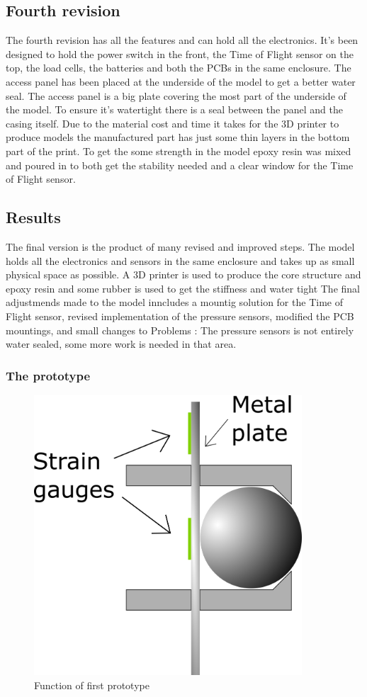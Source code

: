 \subsection{Fourth revision}

The fourth revision has all the features and can hold all the electronics. It's been designed to hold the power switch in the front, the Time of Flight sensor on the top, the load cells, the batteries and both the PCBs in the same enclosure. The access panel has been placed at the underside of the model to get a better water seal. The access panel is a big plate covering the most part of the underside of the model. To ensure it's watertight there is a seal between the panel and the casing itself.
Due to the material cost and time it takes for the 3D printer to produce models the manufactured part has just some thin layers in the bottom part of the print. To get the some strength in the model epoxy resin was mixed and poured in to both get the stability needed and a clear window for the Time of Flight sensor.

\subsection{Results}
The final version is the product of many revised and improved steps. The model holds all the electronics and sensors in the same enclosure and takes up as small physical space as possible. A 3D printer is used to produce the core structure and epoxy resin and some rubber is used to get the stiffness and water tight The final adjustmends made to the model inncludes a mountig solution for the 
Time of Flight sensor, revised implementation of the pressure sensors, modified the PCB mountings, and small changes to 
Problems :
The pressure sensors is not entirely water sealed, some more work is needed in that area.  

\subsubsection{The prototype}

\begin{figure}[H]
\begin{center}
	\includegraphics[width = 10cm]{Figures/Press_sens_func_1.png}
	\caption{Function of first prototype}
	\label{Press_sens_prot_1}
\end{center}
\end{figure}
